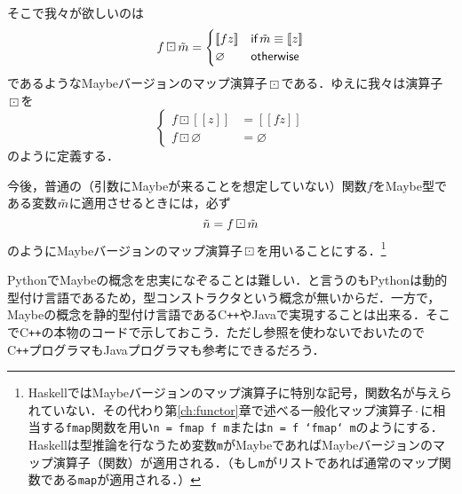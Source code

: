 \documentclass[a5paper,draft]{jsbook}
\def\[{\left[\!\left[}
\def\]{\right]\!\right]}
\newcommand{\programminglanguage}[1]{\textsf{#1}}
\newcommand{\cxx}{\programminglanguage{C}\texttt{++}}
\newcommand{\haskell}{\programminglanguage{Haskell}}
\newcommand{\python}{\programminglanguage{Python}}
\newcommand{\code}[1]{\texttt{#1}}
\newcommand{\mathKeyword}[1]{\operatorname{\textsf{#1}}}
\newcommand{\mathIf}{\mathKeyword{if}}
\newcommand{\mathOtherwise}{\mathKeyword{otherwise}}
\DeclareMathOperator{\hsklFmap}{\cdot}
\DeclareMathOperator{\hsklMaybeMap}{\boxdot}
\newcommand{\hsklNothing}{\varnothing}
\newcommand{\hsklJust}[1]{\[#1\]}
\newcommand{\hsklMaybe}[1]{\Tilde{#1}}
\begin{document}
そこで我々が欲しいのは
\begin{equation}
f\hsklMaybeMap\hsklMaybe{m}=\begin{cases}
\hsklJust{fz}&\mathIf\hsklMaybe{m}\equiv\hsklJust{z}\\
\hsklNothing&\mathOtherwise
\end{cases}
\end{equation}
であるようなMaybeバージョンのマップ演算子$\hsklMaybeMap$である．ゆえに我々は演算子$\hsklMaybeMap$を
\begin{equation}
\left\{
\begin{split}
f\hsklMaybeMap\hsklJust{z}&=\hsklJust{fz}\\
f\hsklMaybeMap\hsklNothing&=\hsklNothing
\end{split}
\right.
\end{equation}
のように定義する．

今後，普通の（引数にMaybeが来ることを想定していない）関数$f$をMaybe型である変数$\hsklMaybe{m}$に適用させるときには，必ず$$\hsklMaybe{n}=f\hsklMaybeMap\hsklMaybe{m}$$のようにMaybeバージョンのマップ演算子$\hsklMaybeMap$を用いることにする．\footnote{\haskell ではMaybeバージョンのマップ演算子に特別な記号，関数名が与えられていない．その代わり第\ref{ch:functor}章で述べる一般化マップ演算子$\hsklFmap$に相当する\code{fmap}関数を用い\code{n = fmap f m}または\code{n = f `fmap` m}のようにする．\haskell は型推論を行なうため変数\code{m}がMaybeであればMaybeバージョンのマップ演算子（関数）が適用される．（もし\code{m}がリストであれば通常のマップ関数である\code{map}が適用される．）}

\python でMaybeの概念を忠実になぞることは難しい．と言うのも\python は動的型付け言語であるため，型コンストラクタという概念が無いからだ．一方で，Maybeの概念を静的型付け言語である\cxx やJavaで実現することは出来る．そこで\cxx の本物のコードで示しておこう．ただし参照を使わないでおいたので\cxx プログラマもJavaプログラマも参考にできるだろう．
\end{document}
